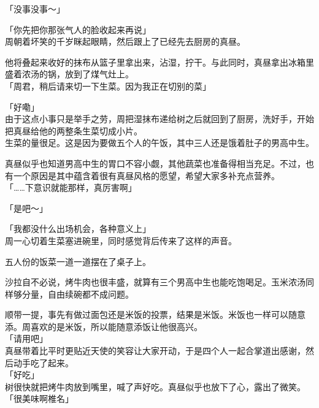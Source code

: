 「没事没事～」

「你先把你那张气人的脸收起来再说」\\

周朝着坏笑的千岁眯起眼睛，然后跟上了已经先去厨房的真昼。

他将叠起来收好的抹布从篮子里拿出来，沾湿，拧干。与此同时，真昼拿出冰箱里盛着浓汤的锅，放到了煤气灶上。\\

「周君，稍后请来切一下生菜。因为我正在切别的菜」

「好嘞」\\

由于这点小事只是举手之劳，周把湿抹布递给树之后就回到了厨房，洗好手，开始把真昼给他的两整条生菜切成小片。\\

生菜的量很足。这是因为要做五个人的午饭，其中三人还是饿着肚子的男高中生。

真昼似乎也知道男高中生的胃口不容小觑，其他蔬菜也准备得相当充足。不过，也有一个原因是其中蕴含着很有真昼风格的愿望，希望大家多补充点营养。\\

「……下意识就能那样，真厉害啊」

「是吧～」

「我都没什么出场机会，各种意义上」\\

周一心切着生菜塞进碗里，同时感觉背后传来了这样的声音。\\

\vspace{2\baselineskip}

五人份的饭菜一道一道摆在了桌子上。

沙拉自不必说，烤牛肉也很丰盛，就算有三个男高中生也能吃饱喝足。玉米浓汤同样够分量，自由续碗都不成问题。

顺带一提，事先有做过面包还是米饭的投票，结果是米饭。米饭也一样可以随意添。周喜欢的是米饭，所以能随意添饭让他很高兴。\\

「请用吧」\\

真昼带着比平时更贴近天使的笑容让大家开动，于是四个人一起合掌道出感谢，然后动手吃了起来。\\

「好吃」\\

树很快就把烤牛肉放到嘴里，喊了声好吃。真昼似乎也放下了心，露出了微笑。\\

「很美味啊椎名」

